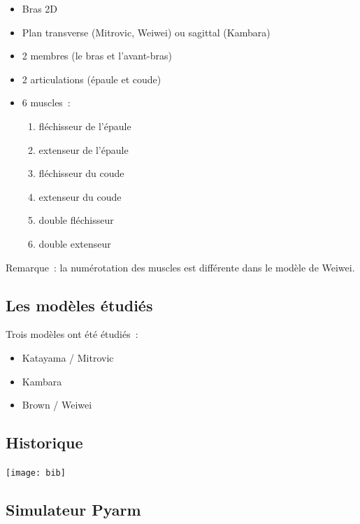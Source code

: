 \documentclass[pdftex,a4paper,11pt]{report}
\numberwithin{equation}{subsection}
\begin{document}
\begin{itemize}
    \item Bras 2D
    \item Plan transverse (Mitrovic, Weiwei) ou sagittal (Kambara)
    \item 2 membres (le bras et l'avant-bras) %
    \item 2 articulations (épaule et coude)
    \item 6 muscles~:
    \begin{enumerate}
        \item fléchisseur de l'épaule
        \item extenseur de l'épaule
        \item fléchisseur du coude
        \item extenseur du coude
        \item double fléchisseur
        \item double extenseur
    \end{enumerate}
\end{itemize}

Remarque~: la numérotation des muscles est différente dans le modèle de Weiwei.

\subsection{Les modèles étudiés}
Trois modèles ont été étudiés~:
\begin{itemize}
    \item Katayama / Mitrovic \cite{katayama1993, ozkaya1999, mitrovic10, mitrovic2008, mitrovic2009}
    \item Kambara \cite{kambara2009, ozkaya1999}
    \item Brown / Weiwei \cite{brown1999, li2006, li2004, todorov2005}
\end{itemize}

\subsection{Historique}

\begin{center}
        \texttt{[image: bib]}
\end{center}

\subsection{Simulateur Pyarm}
\end{document}
